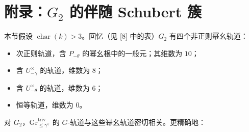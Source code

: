 \section{附录：$G_2$ 的伴随 Schubert 簇}

本节假设 $\operatorname{char}(k)>3$。回忆（见 [8] 中的表）$G_2$ 有四个非正则幂幺轨道：
\begin{itemize}[leftmargin=1.6em, itemsep=.2em]
\item 次正则轨道，含 $P_{-\theta}$ 的幂幺根中的一般元；其维数为 $10$；
\item 含 $U^\times_{-\gamma}$ 的轨道，维数为 $8$；
\item 含 $U^\times_{-\theta}$ 的轨道，维数为 $6$；
\item 恒等轨道，维数为 $0$。
\end{itemize}
对 $G_2$，$\mathrm{Gr}^{\mathrm{triv}}_{\le\gamma^\vee}$ 的 $G$-轨道与这些幂幺轨道密切相关。更精确地：

